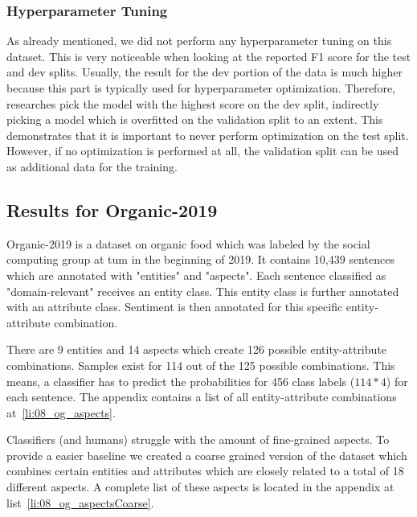 \subsubsection*{Hyperparameter Tuning}
\label{sec:06_hpTuningAmazon}
As already mentioned, we did not perform any hyperparameter tuning on this dataset. This is very noticeable when looking at the reported F1 score for the test and dev splits. Usually, the result for the dev portion of the data is much higher because this part is typically used for hyperparameter optimization. Therefore, researches pick the model with the highest score on the dev split, indirectly picking a model which is overfitted on the validation split to an extent. This demonstrates that it is important to never perform optimization on the test split. However, if no optimization is performed at all, the validation split can be used as additional data for the training.  



\subsection{Results for Organic-2019}
\label{sec:06_ResultsOrganic}

Organic-2019 is a dataset on organic food which was labeled by the social computing group at \gls{tum} in the beginning of 2019. It contains 10,439 sentences which are annotated with "entities" and "aspects". Each sentence classified as "domain-relevant" receives an entity class. This entity class is further annotated with an attribute class. Sentiment is then annotated for this specific entity-attribute combination.
\medskip

There are 9 entities and 14 aspects which create 126 possible entity-attribute combinations. Samples exist for 114 out of the 125 possible combinations. This means, a classifier has to predict the probabilities for 456 class labels {($114*4$)} for each sentence. The appendix contains a list of all entity-attribute combinations at~\ref{li:08_og_aspects}.
\medskip

Classifiers {(and humans)} struggle with the amount of fine-grained aspects. To provide a easier baseline we created a coarse grained version of the dataset which combines certain entities and attributes which are closely related to a total of 18 different aspects. A complete list of these aspects is located in the appendix at list~\ref{li:08_og_aspectsCoarse}.
\medskip

